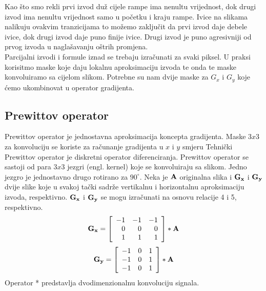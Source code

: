 ﻿\documentclass[conference]{IEEEtran}
\begin{document}
Kao što smo rekli prvi izvod duž cijele rampe ima nenultu vrijednost, dok drugi izvod ima nenultu vrijednost samo u početku i kraju rampe. Ivice na slikama nalikuju ovakvim tranzicijama to možemo zaključit da prvi izvod daje debele ivice, dok drugi izvod daje puno finije ivice. Drugi izvod je puno agresivniji od prvog izvoda u naglašavanju oštrih promjena.\\
Parcijalni izvodi i formule iznad se trebaju izračunati za svaki piksel. U praksi korisitmo maske koje daju lokalnu aproksimaciju izvoda te onda te maske konvoluiramo sa cijelom slikom. Potrebne su nam dvije maske za  $G_x$ i $G_y$ koje ćemo ukombinovat u operator gradijenta.\cite{b3}
\subsection{Prewittov operator}
Prewittov operator je jednostavna aproksimacija koncepta
gradijenta. Maske $3x3$ za konvoluciju  se 
koriste za računanje gradijenta u $x$ i $y$ smjeru Tehnički Prewittov operator je diskretni operator diferenciranja. Prewittov operator se
sastoji  od para $3x3$ jezgri (engl. kernel) koje se konvoluiraju sa slikom. Jedno jezgro je jednostavno drugo rotirano za $90 ^{\circ} $.
Neka je $\bold{A}$ originalna slika i $\bold{G_x}$ i $\bold{G_y}$ dvije slike koje u svakoj tački sadrže vertikalnu i horizontalnu aproksimaciju izvoda, respektivno. $\bold{G_x}$ i $\bold{G_y}$ se mogu izračunati na osnovu relacije 4 i 5, respektivno. 
\begin{equation}
\bold{G_x}=
\begin{bmatrix}
\begin{array}{rrrr}
-1     & -1    & -1 \\ 
0   & 0               &  0 \\ 
1  & 1  & 1\\ 
\end{array}
\end{bmatrix}*\bold{A} 
\end{equation}
\begin{equation}
\bold{G_y}=
\begin{bmatrix}
\begin{array}{rrrr}
-1     & 0     & 1 \\ 
-1   & 0               &  1 \\ 
-1  & 0  & 1\\ 
\end{array}
\end{bmatrix}*\bold{A} 
\end{equation}
Operator * predstavlja dvodimenzionalnu konvoluciju signala.
\end{document}
